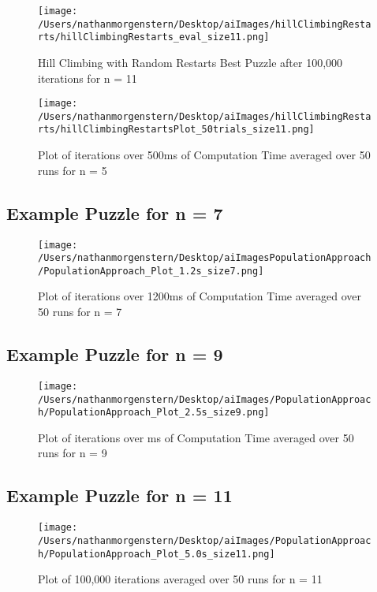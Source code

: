 \documentclass{report}
\begin{document}
	\begin{figure}[H]
	\centering
	\texttt{[image: /Users/nathanmorgenstern/Desktop/aiImages/hillClimbingRestarts/hillClimbingRestarts\_eval\_size11.png]}
	\caption{Hill Climbing with Random Restarts Best Puzzle after 100,000 iterations for n = 11} 
	\label{fig: Hill Climbing with Random Restarts Best Puzzle after 100,000 iterations for n = 11}
	\end{figure}

	\begin{figure}[H]
	\centering
	\texttt{[image: /Users/nathanmorgenstern/Desktop/aiImages/hillClimbingRestarts/hillClimbingRestartsPlot\_50trials\_size11.png]}
	\caption{Plot of iterations over 500ms of Computation Time averaged over 50 runs for n = 5}
	\label{fig: Plot of 100,000 iterations averaged over 50 runs for n = 5}
	\end{figure}

\subsection{Example Puzzle for n = 7}

	\begin{figure}[H]
	\centering
	\texttt{[image: /Users/nathanmorgenstern/Desktop/aiImagesPopulationApproach/PopulationApproach\_Plot\_1.2s\_size7.png]}
	\caption{Plot of iterations over 1200ms of Computation Time averaged over 50 runs for n = 7}
	\label{fig: Plot of 100,000 iterations averaged over 50 runs for n = 11}
	\end{figure}
\subsection{Example Puzzle for n = 9}

	\begin{figure}[H]
	\centering
	\texttt{[image: /Users/nathanmorgenstern/Desktop/aiImages/PopulationApproach/PopulationApproach\_Plot\_2.5s\_size9.png]}
	\caption{Plot of iterations over ms of Computation Time averaged over 50 runs for n = 9}
	\label{fig: Plot of 100,000 iterations averaged over 50 runs for n = 11}
	\end{figure}
\subsection{Example Puzzle for n = 11}

	\begin{figure}[H]
	\centering
	\texttt{[image: /Users/nathanmorgenstern/Desktop/aiImages/PopulationApproach/PopulationApproach\_Plot\_5.0s\_size11.png]}
	\caption{Plot of 100,000 iterations averaged over 50 runs for n = 11}
	\label{fig: Plot of 100,000 iterations averaged over 50 runs for n = 11}
	\end{figure}
\end{document}
